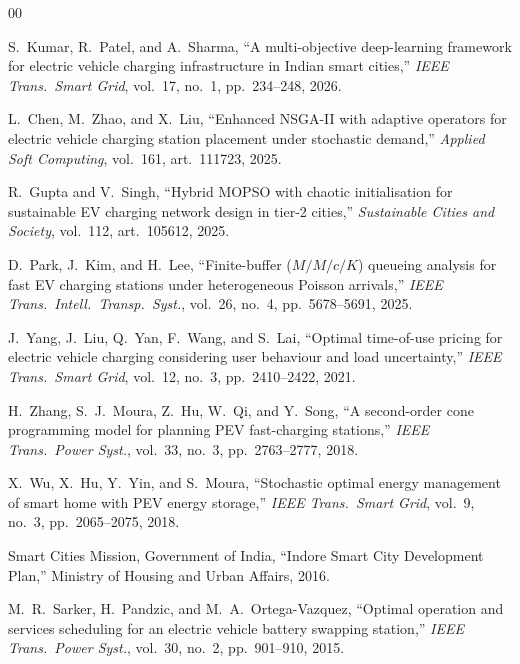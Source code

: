 \documentclass[conference]{IEEEtran}
\begin{document}
\begin{thebibliography}{00}

S.\ Kumar, R.\ Patel, and A.\ Sharma, ``A multi-objective
deep-learning framework for electric vehicle charging
infrastructure in Indian smart cities,'' \emph{IEEE Trans.\
Smart Grid}, vol.\ 17, no.\ 1, pp.\ 234--248, 2026.

L.\ Chen, M.\ Zhao, and X.\ Liu, ``Enhanced NSGA-II with adaptive
operators for electric vehicle charging station placement under
stochastic demand,'' \emph{Applied Soft Computing}, vol.\ 161,
art.\ 111723, 2025.

R.\ Gupta and V.\ Singh, ``Hybrid MOPSO with chaotic initialisation
for sustainable EV charging network design in tier-2 cities,''
\emph{Sustainable Cities and Society}, vol.\ 112,
art.\ 105612, 2025.

D.\ Park, J.\ Kim, and H.\ Lee, ``Finite-buffer ($M/M/c/K$) queueing
analysis for fast EV charging stations under heterogeneous Poisson
arrivals,'' \emph{IEEE Trans.\ Intell.\ Transp.\ Syst.}, vol.\ 26,
no.\ 4, pp.\ 5678--5691, 2025.

J.\ Yang, J.\ Liu, Q.\ Yan, F.\ Wang, and S.\ Lai,
``Optimal time-of-use pricing for electric vehicle charging
considering user behaviour and load uncertainty,''
\emph{IEEE Trans.\ Smart Grid}, vol.\ 12, no.\ 3,
pp.\ 2410--2422, 2021.

H.\ Zhang, S.\ J.\ Moura, Z.\ Hu, W.\ Qi, and Y.\ Song,
``A second-order cone programming model for planning PEV
fast-charging stations,'' \emph{IEEE Trans.\ Power Syst.},
vol.\ 33, no.\ 3, pp.\ 2763--2777, 2018.

X.\ Wu, X.\ Hu, Y.\ Yin, and S.\ Moura, ``Stochastic optimal energy
management of smart home with PEV energy storage,''
\emph{IEEE Trans.\ Smart Grid}, vol.\ 9, no.\ 3,
pp.\ 2065--2075, 2018.

Smart Cities Mission, Government of India,
``Indore Smart City Development Plan,'' Ministry of Housing and
Urban Affairs, 2016.

M.\ R.\ Sarker, H.\ Pandzic, and M.\ A.\ Ortega-Vazquez,
``Optimal operation and services scheduling for an electric vehicle
battery swapping station,'' \emph{IEEE Trans.\ Power Syst.},
vol.\ 30, no.\ 2, pp.\ 901--910, 2015.


\end{thebibliography}
\end{document}
